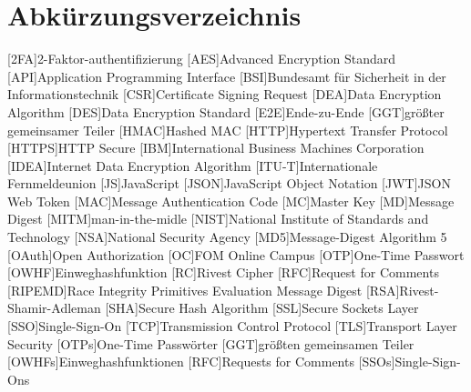 \section*{Abkürzungsverzeichnis}


\begin{acronym}
	[HTTPS]\itemsep0pt %
    [2FA]{2-Faktor-\gls{authentifizierung}}
    [AES]{Advanced Encryption Standard}
    [API]{Application Programming Interface}
    [BSI]{Bundesamt für Sicherheit in der Informationstechnik}
    [CSR]{Certificate Signing Request}
    [DEA]{Data Encryption Algorithm}
    [DES]{Data Encryption Standard}
    [E2E]{Ende-zu-Ende}
    [GGT]{größter gemeinsamer Teiler}
    [H\acs{MAC}]{Hashed \acl{MAC}}
    [HTTP]{Hypertext Transfer Protocol}\label{acro:HTTP}
    [\acs{HTTP}S]{\acl{HTTP} Secure}
    [IBM]{International Business Machines Corporation}
    [IDEA]{Internet Data Encryption Algorithm}
    [ITU-T]{Internationale Fernmeldeunion}
    [JS]{JavaScript}
    [JSON]{JavaScript Object Notation}\label{acro:JSON}
    [JWT]{\acs{JSON} Web Token}
    [MAC]{Message Authentication Code}\label{acro:MAC}
    [MC]{Master Key}
    [MD]{Message Digest}
    [MITM]{man-in-the-midle}\label{acro:MITM}
    [NIST]{National Institute of Standards and Technology}
    [NSA]{National Security Agency}
    [MD5]{Message-Digest Algorithm 5}\label{acro:MD5}
    [OAuth]{Open Authorization}
    [OC]{FOM Online Campus} 
    [OTP]{One-Time Passwort}
    [OWHF]{Einweghashfunktion}
    [RC]{Rivest Cipher}
    [RFC]{Request for Comments}
    [RIPEMD]{Race Integrity Primitives Evaluation Message Digest}
    [RSA]{Rivest-Shamir-Adleman}
    [SHA]{Secure Hash Algorithm}
    [SSL]{Secure Sockets Layer}
    [SSO]{Single-Sign-On}
    [TCP]{Transmission Control Protocol}
    [TLS]{Transport Layer Security}
    [OTPs]{One-Time Passwörter}
    [GGT]{größten gemeinsamen Teiler}
    [OWHFs]{Einweghashfunktionen}
    [RFC]{Requests for Comments}
    [SSOs]{Single-Sign-Ons}
\end{acronym}